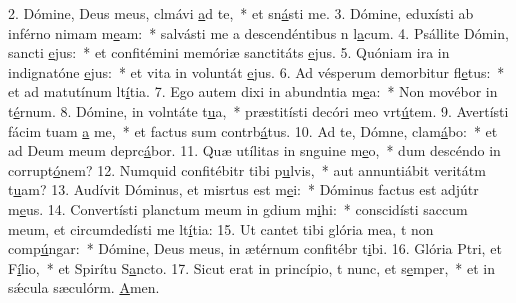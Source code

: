 2. Dómine, Deus meus, clmávi \uline{a}d te,~* et sn\uline{á}sti me.
3. Dómine, eduxísti ab inférno nimam m\uline{e}am:~* salvásti me a descendéntibus n l\uline{a}cum.
4. Psállite Dómin, sancti \uline{e}jus:~* et confitémini memóriæ sanctitáts \uline{e}jus.
5. Quóniam ira in indignatóne \uline{e}jus:~* et vita in voluntát \uline{e}jus.
6. Ad vésperum demorbitur fl\uline{e}tus:~* et ad matutínum lt\uline{í}tia.
7. Ego autem dixi in abundntia m\uline{e}a:~* Non movébor in t\uline{é}rnum.
8. Dómine, in volntáte t\uline{u}a,~* præstitísti decóri meo vrt\uline{ú}tem.
9. Avertísti fácim tuam \uline{a} me,~* et factus sum contrb\uline{á}tus.
10. Ad te, Dómne, clam\uline{á}bo:~* et ad Deum meum deprc\uline{á}bor.
11. Quæ utílitas in snguine m\uline{e}o,~* dum descéndo in corrupt\uline{ó}nem?
12. Numquid confitébitr tibi p\uline{u}lvis,~* aut annuntiábit veritátm t\uline{u}am?
13. Audívit Dóminus, et misrtus est m\uline{e}i:~* Dóminus factus est adjútr m\uline{e}us.
14. Convertísti planctum meum in gdium m\uline{i}hi:~* conscidísti saccum meum, et circumdedísti me lt\uline{í}tia:
15. Ut cantet tibi glória mea, t non comp\uline{ú}ngar:~* Dómine, Deus meus, in ætérnum confitébr t\uline{i}bi.
16. Glória Ptri, et F\uline{í}lio,~* et Spirítu S\uline{a}ncto.
17. Sicut erat in princípio, t nunc, et s\uline{e}mper,~* et in sǽcula sæculórm. \uline{A}men.
